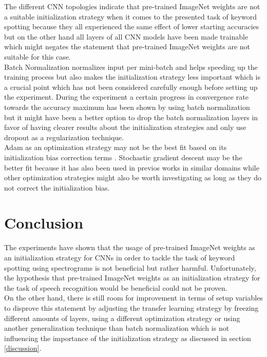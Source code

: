 \documentclass{article}
\theoremstyle{definition}
\theoremstyle{remark}
\begin{document}
The different CNN topologies indicate that pre-trained ImageNet weights are not a suitable initialization strategy when it comes to the presented task of keyword spotting because they all experienced the same effect of lower starting accuracies but on the other hand all layers of all CNN models have been made trainable which might negates the statement that pre-trained ImageNet weights are not suitable for this case.\\
Batch Normalization normalizes input per mini-batch and helps speeding up the training process but also makes the initialization strategy less important \cite{ioffe2015batch} which is a crucial point which has not been considered carefully enough before setting up the experiment. During the experiment a certain progress in convergence rate towards the accuracy maximum has been shown by using batch normalization but it might have been a better option to drop the batch normalization layers in favor of having clearer results about the initialization strategies and only use dropout as a regularization technique.\\
Adam as an optimization strategy may not be the best fit based on its initialization bias correction terms \cite{kingma2014adam}. Stochastic gradient descent may be the better fit because it has also been used in previos works in similar domains \cite{gouda2018speech} while other optimization strategies might also be worth investigating as long as they do not correct the initialization bias.\\


\section{Conclusion}

The experiments have shown that the usage of pre-trained ImageNet weights as an initialization strategy for CNNs in order to tackle the task of keyword spotting using spectrograms is not beneficial but rather harmful. Unfortunately, the hypothesis that pre-trained ImageNet weights as an initialization strategy for the task of speech recognition would be beneficial could not be proven.\\

On the other hand, there is still room for improvement in terms of setup variables to disprove this statement by adjusting the transfer learning strategy by freezing different amounts of layers, using a different optimization strategy or using another generalization technique than batch normalization which is not influencing the importance of the initialization strategy as discussed in section \ref{discussion}.
\end{document}
